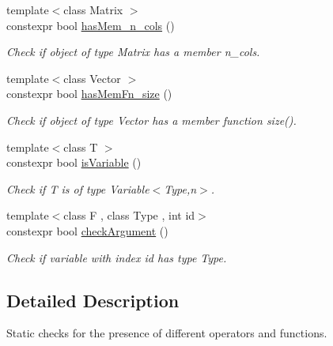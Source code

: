 \begin{DoxyCompactItemize}
{\footnotesize template$<$class Matrix $>$ }\\constexpr bool \hyperlink{group__ConceptCheck_ga196a98efffbe30b11cce354aee5a5b0b}{has\-Mem\-\_\-n\-\_\-cols} ()
\begin{DoxyCompactList}\small\item\em Check if object of type Matrix has a member n\-\_\-cols. \end{DoxyCompactList}\item 
{\footnotesize template$<$class Vector $>$ }\\constexpr bool \hyperlink{group__ConceptCheck_ga48c01f7921e57edba22ceb78efabd580}{has\-Mem\-Fn\-\_\-size} ()
\begin{DoxyCompactList}\small\item\em Check if object of type Vector has a member function size(). \end{DoxyCompactList}\item 
{\footnotesize template$<$class T $>$ }\\constexpr bool \hyperlink{group__ConceptCheck_gac2bf86dec9e756a91d3e97221b803233}{is\-Variable} ()
\begin{DoxyCompactList}\small\item\em Check if T is of type Variable$<$\-Type,n$>$. \end{DoxyCompactList}\item 
{\footnotesize template$<$class F , class Type , int id$>$ }\\constexpr bool \hyperlink{group__ConceptCheck_gaac1dac2cdbc6a9e5555ca15de5e04799}{check\-Argument} ()
\begin{DoxyCompactList}\small\item\em Check if variable with index id has type Type. \end{DoxyCompactList}\end{DoxyCompactItemize}


\subsection{Detailed Description}
Static checks for the presence of different operators and functions. 